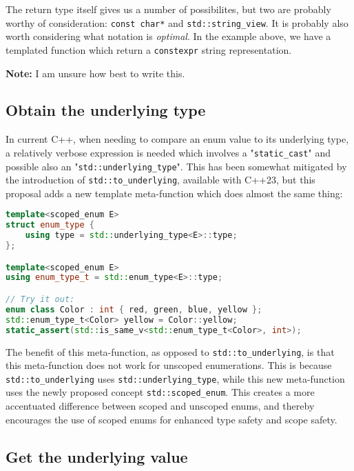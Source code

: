 \documentclass[
  format=manuscript,
  screen=true,
  review=false,
  nonacm=true,
  timestamp=true,
  balance=false]{acmart}
\begin{document}
\noindent
The return type itself gives us a number of possibilites, but two are probably worthy
of consideration: \texttt{const char*} and \texttt{std::string\_view}. It is probably
also worth considering what notation is \textit{optimal}. In the example above, we
have a templated function which return a \texttt{constexpr} string representation.

\vspace{2mm}\noindent
\textbf{Note:} I am unsure how best to write this.


\subsection{Obtain the underlying type}

In current C++, when needing to compare an enum value to its underlying type,
a relatively verbose expression is needed which involves a "\texttt{static\_cast}"
and possible also an "\texttt{std::underlying\_type}". This has been somewhat
mitigated by the introduction of \texttt{std::to\_underlying}, available with C++23,
but this proposal adds a new template meta-function which does almost the same
thing:\vspace{2mm}

\begin{lstlisting}[language=Cpp]
template<scoped_enum E>
struct enum_type {
    using type = std::underlying_type<E>::type;
};

template<scoped_enum E>
using enum_type_t = std::enum_type<E>::type;

// Try it out:
enum class Color : int { red, green, blue, yellow };
std::enum_type_t<Color> yellow = Color::yellow;
static_assert(std::is_same_v<std::enum_type_t<Color>, int>);
\end{lstlisting}

The benefit of this meta-function, as opposed to \texttt{std::to\_underlying}, is
that this meta-function does not work for unscoped enumerations. This is because
\texttt{std::to\_underlying} uses \texttt{std::underlying\_type}, while this new
meta-function uses the newly proposed concept \texttt{std::scoped\_enum}.
This creates a more accentuated difference between scoped and unscoped enums, and
thereby encourages the use of scoped enums for enhanced type safety and scope
safety.


\subsection{Get the underlying value}
\end{document}
